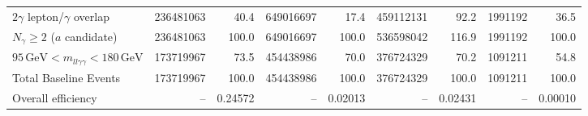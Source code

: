 \begin{table}[htbp]
{\begin{tabular}{lrrrrrrrr}
$2\gamma$ lepton/$\gamma$ overlap & 236481063 & 40.4 & 649016697 & 17.4 & 459112131 & 92.2 & 1991192 & 36.5 \\
$N_{\gamma}\geq 2$ ($a$ candidate) & 236481063 & 100.0 & 649016697 & 100.0 & 536598042 & 116.9 & 1991192 & 100.0 \\
$95\,\mathrm{GeV} < m_{ll\gamma\gamma} < 180\,\mathrm{GeV}$ & 173719967 & 73.5 & 454438986 & 70.0 & 376724329 & 70.2 & 1091211 & 54.8 \\
Total Baseline Events & 173719967 & 100.0 & 454438986 & 100.0 & 376724329 & 100.0 & 1091211 & 100.0 \\
\hline
Overall efficiency & -- & 0.24572 & -- & 0.02013 & -- & 0.02431 & -- & 0.00010 \\
\hline
\end{tabular}%
}
\end{table}

